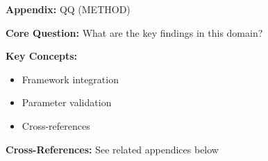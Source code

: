 \begin{tcolorbox}[colback=blue!5!white, colframe=blue!75!black,
    title=Quick Reference: Appendix UNMAPPED_QQ]

\textbf{Appendix:} QQ (METHOD)

\textbf{Core Question:} What are the key findings in this domain?

\textbf{Key Concepts:}
\begin{itemize}[nosep]
\item Framework integration
\item Parameter validation
\item Cross-references
\end{itemize}

\textbf{Cross-References:} See related appendices below
\end{tcolorbox}


\begin{abstract}
This appendix formalizes the segment-dimension multiplier $\sigma_s(I_c)$ that quantifies
how intervention effectiveness varies across behavioral segments. We establish
axioms for multiplier bounds, segment-dimension affinity, and reactance effects.
The complete $6 \times 8$ Segment-Dimension Affinity Matrix provides empirically-calibrated
$\sigma$ values derived from Fehr's heterogeneity research and meta-analytic
evidence. Note: The 10C dimensions are the primitives; interventions \textit{emerge}
from the continuous 10C space $[0,1]^9$ based on context analysis.
This enables precise targeting and avoidance of backfire effects.
\end{abstract}



